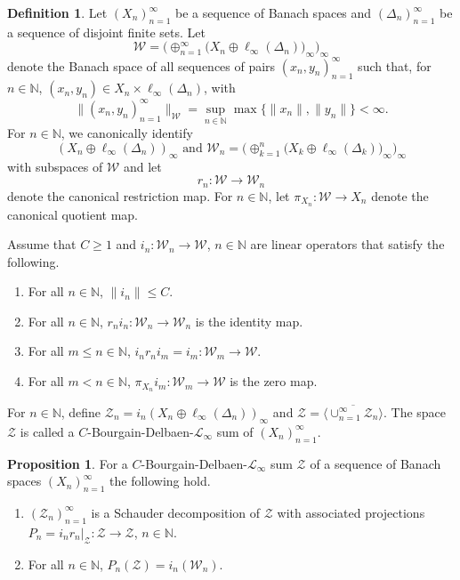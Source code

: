 \documentclass[11pt]{amsart}
\theoremstyle{definition}
\newtheorem{definition}[theorem]{Definition}
\newtheorem{proposition}[theorem]{Proposition}
\newcommand{\N}{\mathbb{N}}
\numberwithin{equation}{section}
\begin{document}
\begin{definition}
\label{abstract BD sum}
Let $(X_n)_{n=1}^\infty$ be a sequence of Banach spaces and $(\Delta_n)_{n=1}^\infty$ be a sequence of disjoint finite sets. Let
\[\mathcal{W} = \big(\oplus_{n=1}^\infty\big(X_n\oplus\ell_\infty(\Delta_n)\big)_\infty\big)_\infty\]
denote the Banach space of all sequences of pairs $(x_n,y_n)_{n=1}^\infty$ such that, for $n\in\N$, $(x_n,y_n)\in X_n\times \ell_\infty(\Delta_n)$, with
\begin{equation*}
\|(x_n,y_n)_{n=1}^\infty\|_\mathcal{W} = \sup_{n\in\N}\max\{\|x_n\|,\|y_n\|\} <\infty.
\end{equation*}
For $n\in\N$, we canonically identify
\[(X_n\oplus\ell_\infty(\Delta_n))_\infty\text{ and }\mathcal{W}_n = \big(\oplus_{k=1}^n\big(X_k\oplus\ell_\infty(\Delta_k)\big)_\infty\big)_\infty\]
with subspaces of $\mathcal{W}$ and let
\[r_n:\mathcal{W}\to \mathcal{W}_n\]
denote the canonical restriction map. For $n\in\N$, let $\pi_{X_n}:\mathcal{W}\to X_n$ denote the canonical quotient map.

Assume that $C\geq1$ and $i_n:\mathcal{W}_n\to\mathcal{W}$, $n\in\N$ are linear operators that satisfy the following.
\begin{enumerate}[label=(\greek*)]
    \item\label{BD assumption a} For all $n\in\N$, $\|i_n\|\leq C$.
    \item\label{BD assumption b} For all $n\in\N$, $r_ni_n:\mathcal{W}_n\to\mathcal{W}_n$ is the identity map.
    \item\label{BD assumption c} For all $m\leq n\in\N$, $i_nr_ni_m = i_m:\mathcal{W}_m\to\mathcal{W}$.
    \item\label{BD assumption d} For all $m<n\in\N$, $\pi_{X_n}i_m:\mathcal{W}_m\to\mathcal{W}$ is the zero map.
\end{enumerate}
For $n\in\N$, define $\mathcal{Z}_n = i_n(X_n\oplus\ell_\infty(\Delta_n))_\infty$ and $\mathcal{Z} = \overline{\langle\cup_{n=1}^\infty\mathcal{Z}_n\rangle}$. The space $\mathcal{Z}$ is called a $C$-Bourgain-Delbaen-$\mathscr{L}_\infty$ sum of $(X_n)_{n=1}^\infty$.
\end{definition}

\begin{proposition}
\label{standard BD decomposition}
For a $C$-Bourgain-Delbaen-$\mathscr{L}_\infty$ sum $\mathcal{Z}$ of a sequence of Banach spaces $(X_n)_{n=1}^\infty$ the following hold.
\begin{enumerate}[label=(\roman*),leftmargin=19pt]

    \item\label{standard BD decomposition i} $(\mathcal{Z}_n)_{n=1}^\infty$ is a Schauder decomposition of $\mathcal{Z}$ with associated projections $P_n = i_nr_n|_{\mathcal{Z}}:\mathcal{Z}\to\mathcal{Z}$, $n\in\N$.

    \item\label{standard BD decomposition ii} For all $n\in\N$, $P_n(\mathcal{Z}) = i_n(\mathcal{W}_n)$.
    
\end{enumerate}

\end{proposition}
\end{document}
